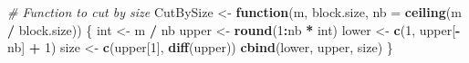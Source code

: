 \documentclass[11pt,]{article}
\newenvironment{Shaded}{\begin{snugshade}}{\end{snugshade}}
\newcommand{\CommentTok}[1]{\textcolor[rgb]{0.56,0.35,0.01}{\textit{#1}}}
\newcommand{\ControlFlowTok}[1]{\textcolor[rgb]{0.13,0.29,0.53}{\textbf{#1}}}
\newcommand{\DataTypeTok}[1]{\textcolor[rgb]{0.13,0.29,0.53}{#1}}
\newcommand{\DecValTok}[1]{\textcolor[rgb]{0.00,0.00,0.81}{#1}}
\newcommand{\KeywordTok}[1]{\textcolor[rgb]{0.13,0.29,0.53}{\textbf{#1}}}
\newcommand{\NormalTok}[1]{#1}
\newcommand{\OperatorTok}[1]{\textcolor[rgb]{0.81,0.36,0.00}{\textbf{#1}}}
\newcommand{\StringTok}[1]{\textcolor[rgb]{0.31,0.60,0.02}{#1}}
\begin{document}
\begin{Shaded}
\begin{Highlighting}[]
{{\CommentTok{# Function to cut by size}
\NormalTok{CutBySize <-}\StringTok{ }\ControlFlowTok{function}\NormalTok{(m, block.size, }\DataTypeTok{nb =} \KeywordTok{ceiling}\NormalTok{(m }\OperatorTok{/}\StringTok{ }\NormalTok{block.size)) \{}
\NormalTok{  int <-}\StringTok{ }\NormalTok{m }\OperatorTok{/}\StringTok{ }\NormalTok{nb}
\NormalTok{  upper <-}\StringTok{ }\KeywordTok{round}\NormalTok{(}\DecValTok{1}\OperatorTok{:}\NormalTok{nb }\OperatorTok{*}\StringTok{ }\NormalTok{int)}
\NormalTok{  lower <-}\StringTok{ }\KeywordTok{c}\NormalTok{(}\DecValTok{1}\NormalTok{, upper[}\OperatorTok{-}\NormalTok{nb] }\OperatorTok{+}\StringTok{ }\DecValTok{1}\NormalTok{)}
\NormalTok{  size <-}\StringTok{ }\KeywordTok{c}\NormalTok{(upper[}\DecValTok{1}\NormalTok{], }\KeywordTok{diff}\NormalTok{(upper))}
  \KeywordTok{cbind}\NormalTok{(lower, upper, size)}
\NormalTok{\}}

}}
\end{Highlighting}
\end{Shaded}
\end{document}
